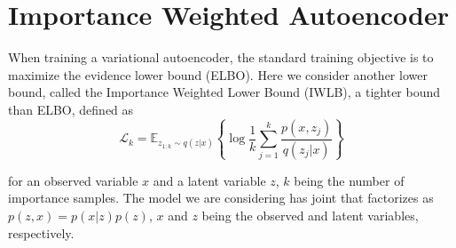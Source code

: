 \documentclass[paper=a4, fontsize=11pt]{scrartcl} %
\numberwithin{equation}{section} %
\numberwithin{figure}{section} %
\numberwithin{table}{section} %
\newcommand{\Ex}[2]{\mathbb{E}_{#1}\left\{#2\right\}}
\begin{document}
\section{Importance Weighted Autoencoder}
When training a variational autoencoder, the standard training objective is to maximize the evidence lower bound (ELBO). Here we consider another lower bound, called the Importance Weighted Lower Bound (IWLB), a tighter bound than ELBO, defined as
$$\mathcal{L}_k = \Ex{z_{1:k}\sim q(z|x)}{\log \frac{1}{k} \sum_{j=1}^k \frac{p(x,z_j)}{q(z_j|x)}} $$

for an observed variable $x$ and a latent variable $z$, $k$ being the number of importance samples. The model we are considering has joint that factorizes as $p(z, x) = p(x | z)p(z)$, $x$ and $z$ being the observed and latent variables, respectively.
\end{document}
